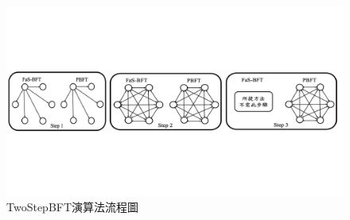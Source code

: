 \begin{figure}[]
\centering
\includegraphics[scale=0.45]{images/31.png}
\caption{TwoStepBFT演算法流程圖}
\label{i:byz-latency}
\end{figure}